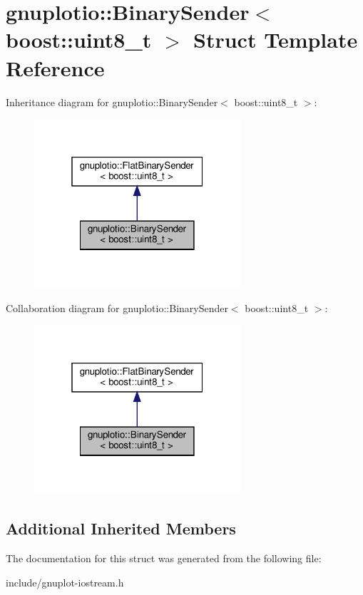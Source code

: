 \hypertarget{structgnuplotio_1_1BinarySender_3_01boost_1_1uint8__t_01_4}{}\section{gnuplotio\+:\+:Binary\+Sender$<$ boost\+:\+:uint8\+\_\+t $>$ Struct Template Reference}
\label{structgnuplotio_1_1BinarySender_3_01boost_1_1uint8__t_01_4}


Inheritance diagram for gnuplotio\+:\+:Binary\+Sender$<$ boost\+:\+:uint8\+\_\+t $>$\+:\nopagebreak
\begin{figure}[H]
\begin{center}
\leavevmode
\includegraphics[width=217pt]{structgnuplotio_1_1BinarySender_3_01boost_1_1uint8__t_01_4__inherit__graph}
\end{center}
\end{figure}


Collaboration diagram for gnuplotio\+:\+:Binary\+Sender$<$ boost\+:\+:uint8\+\_\+t $>$\+:\nopagebreak
\begin{figure}[H]
\begin{center}
\leavevmode
\includegraphics[width=217pt]{structgnuplotio_1_1BinarySender_3_01boost_1_1uint8__t_01_4__coll__graph}
\end{center}
\end{figure}
\subsection*{Additional Inherited Members}


The documentation for this struct was generated from the following file\+:\begin{DoxyCompactItemize}
\item 
include/gnuplot-\/iostream.\+h\end{DoxyCompactItemize}
